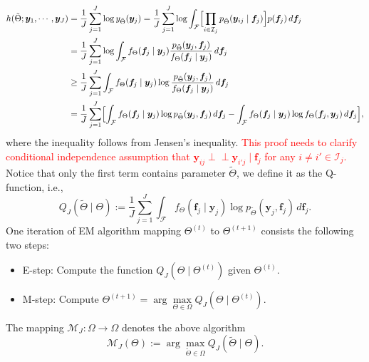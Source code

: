 \documentclass[]{report}
\theoremstyle{definition}
\begin{document}
\begin{equation}
    \begin{aligned}
    h(\tilde{\Theta}; \bm{y}_{1},\cdots,\bm{y}_{J})&=\dfrac{1}{J} \sum_{j=1}^{J} \log y_{\tilde{\Theta}}(\bm{y}_{j})=\dfrac{1}{J} \sum_{j=1}^{J} \log \int_{\mathcal{F}} \Bigl[\prod_{i\in \mathcal{I}_{j}}p_{\tilde{\Theta}}(\bm{y}_{ij}\mid \bm{f}_{j})\Bigr]p(\bm{f}_{j})\, d\bm{f}_{j}\\
    &= \dfrac{1}{J} \sum_{j=1}^{J} \log \int_{\mathcal{F}} f_{\Theta}(\bm{f}_{j}\mid \bm{y}_{j})\dfrac{p_{\tilde{\Theta}}(\bm{y}_{j},\bm{f}_{j})}{f_{\Theta}(\bm{f}_{j}\mid \bm{y}_{j})}\,d\bm{f}_{j}\\
    &\geq \dfrac{1}{J} \sum_{j=1}^{J} \int_{\mathcal{F}} f_{\Theta}(\bm{f}_{j}\mid \bm{y}_{j})\log \dfrac{p_{\tilde{\Theta}}(\bm{y}_{j},\bm{f}_{j})}{f_{\Theta}(\bm{f}_{j}\mid \bm{y}_{j})}\,d\bm{f}_{j}\\
    &= \dfrac{1}{J} \sum_{j=1}^{J} \Bigl[\int_{\mathcal{F}} f_{\Theta}(\bm{f}_{j}\mid \bm{y}_{j})\log p_{\tilde{\Theta}}(\bm{y}_{j},\bm{f}_{j})\,d\bm{f}_{j}-\int_{\mathcal{F}} f_{\Theta}(\bm{f}_{j}\mid \bm{y}_{j})\log f_{\Theta}(\bm{f}_{j},\bm{y}_{j})\,d\bm{f}_{j}\Bigr],
\end{aligned}
\end{equation}
where the inequality follows from Jensen's inequality. \textcolor{red}{This proof needs to clarify conditional independence assumption that $\bm{y}_{ij}\perp\!\!\!\perp \bm{y}_{i'j} \mid \bm{f}_{j}$ for any $i\neq i'\in \mathcal{I}_{j}$.} Notice that only the first term contains parameter $\tilde{\Theta}$, we define it as the Q-function, i.e.,
\begin{equation}
    Q_{J}(\tilde{\Theta}\mid \Theta):=\dfrac{1}{J} \sum_{j=1}^{J} \int_{\mathcal{F}} f_{\Theta}(\bm{f}_{j}\mid \bm{y}_{j})\log p_{\tilde{\Theta}}(\bm{y}_{j},\bm{f}_{j})\,d\bm{f}_{j}.
    \label{eq: Q_function}
\end{equation}
One iteration of EM algorithm mapping $\Theta^{(t)}$ to $\Theta^{(t+1)}$ consists the following two steps:
\begin{itemize}
    \item E-step: Compute the function $ Q_{J}(\Theta\mid \Theta^{(t)})$ given $\Theta^{(t)}$.
    \item M-step: Compute $\Theta^{(t+1)}=\arg\max\limits_{\Theta \in \Omega}Q_{J}(\Theta\mid \Theta^{(t)})$.
\end{itemize}
The mapping $\mathcal{M}_{J}:\Omega \to \Omega$ denotes the above algorithm
\begin{equation}
    \mathcal{M}_{J}(\Theta):=\arg\max\limits_{\tilde{\Theta} \in \Omega}Q_{J}(\tilde{\Theta}\mid \Theta).
\end{equation}
\end{document}
